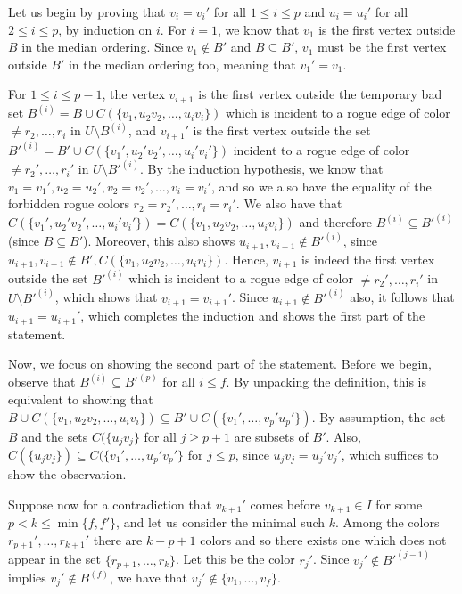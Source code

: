 \documentclass[a4paper,11pt]{article}
\makeatletter
\renewenvironment{proof}[1][\proofname] {\par\pushQED{\qed}\normalfont\topsep6\p@\@plus6\p@\relax\trivlist\item[\hskip\labelsep\bfseries#1\@addpunct{.}]\ignorespaces}{\popQED\endtrivlist\@endpefalse}
\theoremstyle{definition}
\makeatother
\begin{document}
\begin{proof}
Let us begin by proving that $v_i=v_i'$ for all $1\leq i\leq p$ and $u_i=u_i'$ for all $2\leq i\leq p$, by induction on $i$. For $i=1$, we know that $v_1$ is the first vertex outside $B$ in the median ordering. Since $v_1\notin B'$ and $B\subseteq B'$, $v_1$ must be the first vertex outside $B'$ in the median ordering too, meaning that $v_1'=v_1$.

For $1\leq i\leq p-1$, the vertex $v_{i+1}$ is the first vertex outside the temporary bad set $B^{(i)}=B\cup C(\{v_1, u_2v_2, \dots, u_iv_i\})$ which is incident to a rogue edge of color $\neq r_2, \dots, r_i$ in $U\setminus B^{(i)}$, and $v_{i+1}'$ is the first vertex outside the set $B'^{(i)}=B'\cup C(\{v_1', u_2'v_2', \dots, u_i'v_i'\})$ incident to a rogue edge of color $\neq r_2', \dots, r_i'$ in $U\setminus B'^{(i)}$. 
By the induction hypothesis, we know that $v_1=v_1', u_2=u_2', v_2=v_2', \dots, v_i=v_i'$, and so we also have the equality of the forbidden rogue colors $r_2=r_2', \dots, r_i=r_i'$.  
We also have that $C(\{v_1', u_2'v_2', \dots, u_i'v_i'\})=C(\{v_1, u_2v_2, \dots, u_iv_i\})$ and therefore $B^{(i)}\subseteq B'^{(i)}$ (since $B\subseteq B'$). Moreover, this also shows $u_{i+1}, v_{i+1}\notin B'^{(i)}$, since $u_{i+1}, v_{i+1}\notin B', C(\{v_1, u_2v_2, \dots, u_iv_i\})$. Hence, $v_{i+1}$ is indeed the first vertex outside the set $B'^{(i)}$ which is incident to a rogue edge of color $\neq r_2', \dots, r_i'$ in $U\setminus B'^{(i)}$, which shows that $v_{i+1}=v_{i+1}'$. Since $u_{i+1}\notin B'^{(i)}$ also, it follows that $u_{i+1}=u_{i+1}'$, which completes the induction and shows the first part of the statement.

Now, we focus on showing the second part of the statement. Before we begin, observe that $B^{(i)}\subseteq B'^{(p)}$ for all $i\leq f$. By unpacking the definition, this is equivalent to showing that $B\cup C(\{v_1, u_2v_2, \dots, u_iv_i\})\subseteq B'\cup C(\{v_1', \dots, v_{p}'u_p'\})$. By assumption, the set $B$ and the sets $C(\{u_jv_j\}$ for all $j\geq p+1$ are subsets of $B'$. Also, $C(\{u_jv_j\})\subseteq C(\{v_1', \dots, u_p'v_p'\}$ for $j\leq p$, since $u_jv_j=u_j'v_j'$, which suffices to show the observation. 

Suppose now for a contradiction that $v_{k+1}'$ comes before $v_{k+1}\in I$ for some $p<k\leq \min\{f, f'\}$, and let us consider the minimal such $k$. Among the colors $r_{p+1}', \dots, r_{k+1}'$ there are $k-p+1$ colors and so there exists one which does not appear in the set $\{r_{p+1}, \dots, r_{k}\}$. Let this be the color $r_j'$. Since $v_j'\notin {B'}^{(j-1)}$ implies $v_j'\notin B^{(f)}$, we have that $v_j' \notin \{v_{1}, \dots, v_f\}$.


\end{proof}
\end{document}

